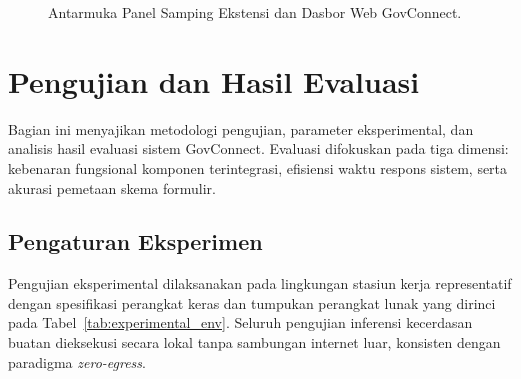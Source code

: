 \documentclass[conference]{IEEEtran}
\begin{document}
\begin{figure}[!htbp]
\centering
{}
\caption{Antarmuka Panel Samping Ekstensi dan Dasbor Web GovConnect.}
\label{fig:mockup_ui}
\end{figure}

\section{Pengujian dan Hasil Evaluasi}

Bagian ini menyajikan metodologi pengujian, parameter eksperimental, dan analisis hasil evaluasi sistem GovConnect. Evaluasi difokuskan pada tiga dimensi: kebenaran fungsional komponen terintegrasi, efisiensi waktu respons sistem, serta akurasi pemetaan skema formulir.

\subsection{Pengaturan Eksperimen}
Pengujian eksperimental dilaksanakan pada lingkungan stasiun kerja representatif dengan spesifikasi perangkat keras dan tumpukan perangkat lunak yang dirinci pada Tabel~\ref{tab:experimental_env}. Seluruh pengujian inferensi kecerdasan buatan dieksekusi secara lokal tanpa sambungan internet luar, konsisten dengan paradigma \textit{zero-egress}.
\end{document}
